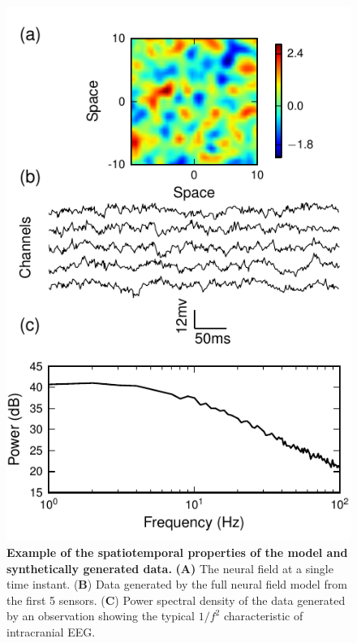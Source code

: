 \documentclass[12pt]{iopart}
\begin{document}
\begin{figure}[!ht]
\begin{center}
\includegraphics{./Graph/pdf/Figure3.pdf}
\end{center}
\caption{{\bf Example of the spatiotemporal properties of the model and synthetically generated data.} \textbf{(A)} The neural field at a single time instant. (\textbf{B}) Data generated by the full neural field model from the first 5 sensors. (\textbf{C}) Power spectral density of the data generated by an observation showing the typical $1/f^2$ characteristic of intracranial EEG.} 
\label{fig:Figure3}
\end{figure}
\end{document}
